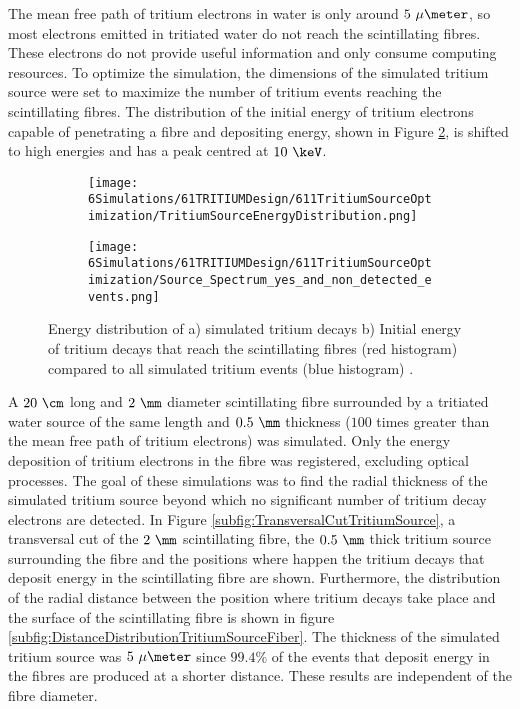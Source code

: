 The mean free path of tritium electrons in water is only around $5~\mu\meter$, so most electrons emitted in tritiated water do not reach the scintillating fibres. These electrons do not provide useful information and only consume computing resources. To optimize the simulation, the dimensions of the simulated tritium source were set to maximize the number of tritium events reaching the scintillating fibres. The distribution of the initial energy of tritium electrons capable of penetrating a fibre and depositing energy, shown in Figure \ref{subfig:EnergySpectrumEventsDetectedandNonDetected}, is shifted to high energies and has a peak centred at $10~\keV$. 

\begin{figure}
\centering
    \begin{subfigure}[b]{0.6\textwidth}
    \centering
    \texttt{[image: 6Simulations/61TRITIUMDesign/611TritiumSourceOptimization/TritiumSourceEnergyDistribution.png]}  
    \caption{\label{subfig:EnergyDistributionTritiumSource}}
    \end{subfigure}
    \hfill
    \begin{subfigure}[b]{0.6\textwidth}
    \centering
    \texttt{[image: 6Simulations/61TRITIUMDesign/611TritiumSourceOptimization/Source\_Spectrum\_yes\_and\_non\_detected\_events.png]}  
    \caption{\label{subfig:EnergySpectrumEventsDetectedandNonDetected}}
    \end{subfigure}
 \caption{Energy distribution of a) simulated tritium decays b) Initial energy of tritium decays that reach the scintillating fibres (red histogram) compared to all simulated tritium events (blue histogram) \cite{SimulationPaperCarlos}.
 \label{fig:TritiumSourceOptimization}}
\end{figure}

A $20~\cm$ long and $2~\mm$ diameter scintillating fibre surrounded by a tritiated water source of the same length and $0.5~\mm$ thickness ($100$ times greater than the mean free path of tritium electrons) was simulated. Only the energy deposition of tritium electrons in the fibre was registered, excluding optical processes. The goal of these simulations was to find the radial thickness of the simulated tritium source beyond which no significant number of tritium decay electrons are detected. In Figure \ref{subfig:TransversalCutTritiumSource}, a transversal cut of the $2~\mm$ scintillating fibre, the $0.5~\mm$ thick tritium source surrounding the fibre and the positions where happen the tritium decays that deposit energy in the scintillating fibre are shown. Furthermore, the distribution of the radial distance between the position where tritium decays take place and the surface of the scintillating fibre is shown in figure \ref{subfig:DistanceDistributionTritiumSourceFiber}. The thickness of the simulated tritium source was $5~\mu\meter$ since $99.4\%$ of the events that deposit energy in the fibres are produced at a shorter distance. These results are independent of the fibre diameter.

